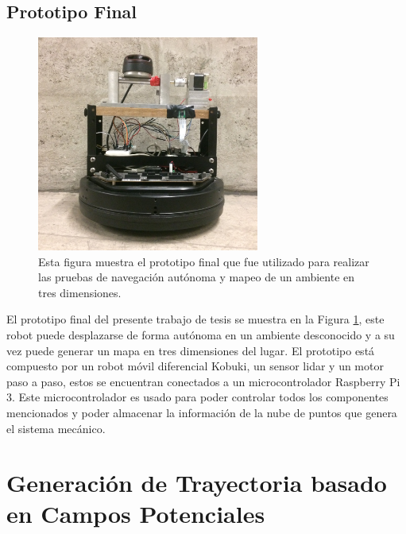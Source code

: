 \subsection{Prototipo Final}
\begin{figure}%
	\centering \footnotesize
	\includegraphics[width=0.65\textwidth]{images/ProtFinal.JPG}
	\captionsetup{font=footnotesize}
	\caption{Esta figura muestra el prototipo final que fue utilizado para realizar las pruebas
	de navegación autónoma y mapeo de un ambiente en tres dimensiones. }
	\label{fig:ProtoFinal}
\end{figure}
El prototipo final del presente trabajo de tesis se muestra en la Figura \ref{fig:ProtoFinal}, 
este robot puede desplazarse de forma autónoma en un ambiente desconocido y a su vez 
puede generar un mapa en tres dimensiones del lugar. El prototipo está compuesto por un robot
móvil diferencial Kobuki, un sensor lidar y un motor paso a paso, estos se encuentran conectados
a un microcontrolador Raspberry Pi 3. Este microcontrolador es usado para poder controlar 
todos los componentes mencionados y poder almacenar la información de la nube de puntos que genera 
el sistema mecánico.



\section{Generación de Trayectoria basado en Campos Potenciales}
\label{sec:autonomia}

